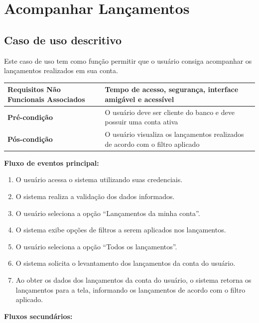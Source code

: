 \section{Acompanhar Lançamentos}

\subsection{Caso de uso descritivo}

Este caso de uso tem como função permitir que o usuário consiga acompanhar os lançamentos realizados em sua conta.

\begin{table}[h]
  \centering
  \begin{tabular}{|p{4cm} | p{10cm} |}
      \hline
      \small{\textbf{Requisitos Não Funcionais Associados}}	&	Tempo de acesso, segurança, interface amigável e acessível	\\ \hline
      \textbf{Pré-condição}	&	O usuário deve ser cliente do banco e deve possuir uma conta ativa	\\ \hline
      \textbf{Pós-condição}	&	O usuário visualiza os lançamentos realizados de acordo com o filtro aplicado	\\ \hline
    \end{tabular}
\end{table}

\textbf{Fluxo de eventos principal:}

\begin{enumerate}
  \item O usuário acessa o sistema utilizando suas credenciais.
  \item O sistema realiza a validação dos dados informados.
  \item O usuário seleciona a opção ``Lançamentos da minha conta''.
  \item O sistema exibe opções de filtros a serem aplicados nos lançamentos.
  \item O usuário seleciona a opção ``Todos os lançamentos''.
  \item O sistema solicita o levantamento dos lançamentos da conta do usuário.
  \item Ao obter os dados dos lançamentos da conta do usuário, o sistema retorna os lançamentos para a tela, informando os lançamentos de acordo com o filtro aplicado.
\end{enumerate}

\textbf{Fluxos secundários:}

